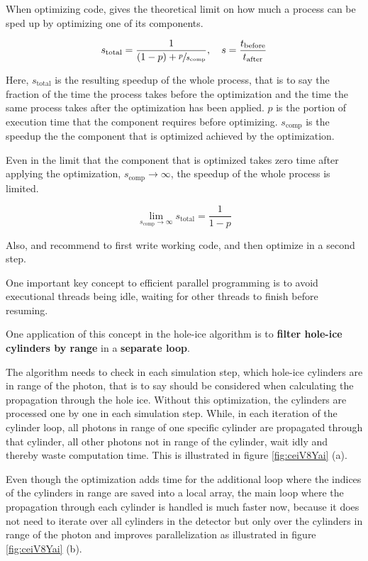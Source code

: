 When optimizing code,  gives the theoretical limit on how much a process can be sped up by optimizing one of its components. \cite{raytracingtips}

$$ s_\text{total} = \frac{1}{(1 - p) + \sfrac{p}{s_\text{comp}}}, \ \ \ s = \frac{t_\text{before}}{t_\text{after}} $$

Here, $s_\text{total}$ is the resulting speedup of the whole process, that is to say the fraction of the time the process takes before the optimization and the time the same process takes after the optimization has been applied. $p$ is the portion of execution time that the component requires before optimizing. $s_\text{comp}$ is the speedup the the component that is optimized achieved by the optimization.

Even in the limit that the component that is optimized takes zero time after applying the optimization, $s_\text{comp}\rightarrow\infty$, the speedup of the whole process is limited.

$$ \lim_{s_\text{comp}\rightarrow\infty} s_\text{total} = \frac{1}{1-p} $$

Also,  and  \cite{raytracingtips} recommend to first write working code, and then optimize in a second step.

One important key concept to efficient parallel programming is to avoid executional threads being idle, waiting for other threads to finish before resuming.


One application of this concept in the hole-ice algorithm is to \textbf{filter hole-ice cylinders by range} in a \textbf{separate loop}.

The algorithm needs to check in each simulation step, which hole-ice cylinders are in range of the photon, that is to say should be considered when calculating the propagation through the hole ice. Without this optimization, the cylinders are processed one by one in each simulation step. While, in each iteration of the cylinder loop, all photons in range of one specific cylinder are propagated through that cylinder, all other photons not in range of the cylinder, wait idly and thereby waste computation time. This is illustrated in figure \ref{fig:ceiV8Yai} (a).

Even though the optimization adds time for the additional loop where the indices of the cylinders in range are saved into a local array, the main loop where the propagation through each cylinder is handled is much faster now, because it does not need to iterate over all cylinders in the detector but only over the cylinders in range of the photon and improves parallelization as illustrated in figure \ref{fig:ceiV8Yai} (b).

